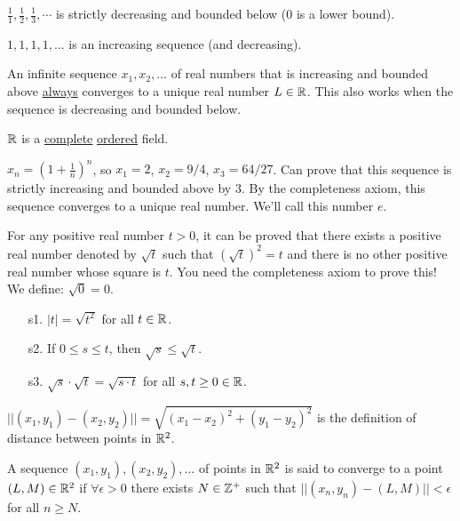 \documentclass[]{article}
\begin{document}
\begin{example}
	$\frac{1}{1},\frac{1}{2},\frac{1}{3},\cdots$ is strictly decreasing and bounded below (0 is a lower bound).	
\end{example}
\begin{example}
	$1,1,1,1,\dots$ is an increasing sequence (and decreasing).
\end{example}

\begin{definition}
	 An infinite sequence $x_1,x_2,\dots$ of real numbers that is increasing and bounded above \ul{always} converges to a unique real number $L\in\mathbb{R}$. This also works when the sequence is decreasing and bounded below.
\end{definition}
\begin{note}
	$\mathbb{R}$ is a \ul{complete} \ul{ordered} field.
\end{note}
\begin{example}
	$x_n=(1+\frac{1}{n})^n$, so $x_1=2$, $x_2=9/4$, $x_3=64/27$. Can prove that this sequence is strictly increasing and bounded above by 3. By the completeness axiom, this sequence converges to a unique real number. We'll call this number $e$.
\end{example}
For any positive real number $t>0$, it can be proved that there exists a positive real number denoted by $\sqrt{t}$ such that $(\sqrt{t})^2=t$ and there is no other positive real number whose square is $t$. You need the completeness axiom to prove this! We define: $\sqrt{0} = 0$.

\begin{enumerate}
	\item[s1.] $|t|=\sqrt{t^2}$ for all $t\in\mathbb{R}$.
	\item[s2.] If $0\leq s\leq t$, then $\sqrt{s}\leq\sqrt{t}$.
	\item[s3.] $\sqrt{s}\cdot\sqrt{t} = \sqrt{s\cdot t} $ for all $s,t\geq0\in\mathbb{R}$.
\end{enumerate}

\begin{note}
	$||(x_1,y_1)-(x_2,y_2)|| = \sqrt{(x_1-x_2)^2+(y_1-y_2)^2}$ is the definition of distance between points in $\mathbb{R}^2$.
\end{note}
\begin{remark}
	A sequence $(x_1,y_1),(x_2,y_2),\dots$ of points in $\mathbb{R}^2$ is said to converge to a point $(L,M)\in\mathbb{R}^2$ if $\forall\epsilon>0$ there exists $N\in\mathbb{Z}^+$ such that $ ||(x_n,y_n)-(L,M)|| < \epsilon $ for all $n\geq N$.
\end{remark}
\end{document}
